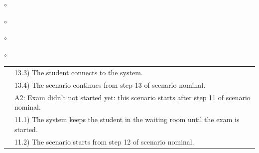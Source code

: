 \documentclass[]{uc2pfecaneva}
\begin{document}
\begin{list}{$\circ$}{}
\begin{list}{$\circ$}{}
\begin{list}{$\circ$}{}
\begin{list}{$\circ$}{}
\begin{table}[h]
\begin{tabularx}{\textwidth}{|l|X|}
            & \hspace{4mm}13.3) The student connects to the system.                                             \\
            & \hspace{4mm}13.4) The scenario continues from step 13 of scenario nominal.                        \\
            & A2: Exam didn't not started yet: this scenario starts after step 11 of scenario nominal.          \\
            & \hspace{4mm}11.1) The system keeps the student in the waiting room until the exam is started.     \\
            & \hspace{4mm}11.2) The scenario starts from step 12 of scenario nominal.                           \\ \hline
        \end{tabularx}


\end{table}
\end{list}
\end{list}
\end{list}
\end{list}
\end{document}
